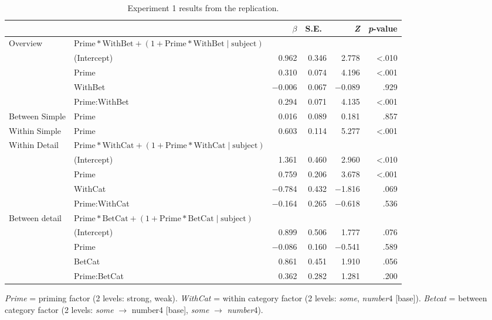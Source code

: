 \documentclass[10pt]{article}
\begin{document}
\begin{multicols}{2}
\begin{table}[ht]
  \caption{Experiment 1 results from the replication.}\vspace{-20pt}
  \label{tab:represults}
  \begin{center}
    \begin{tabular}{llrrrr}
      \hline
      & & \(\beta\) & S.E.\ & \emph{Z} & \emph{p}-value  \\
      \hline
      Overview & \(\text{Prime} * \text{WithBet} + (1 + \text{Prime} * \text{WithBet} \mid \text{subject})\) & & & \\
      & (Intercept)   & 0.962  & 0.346 &  2.778 & <.010 \\
      & Prime         & 0.310  & 0.074 &  4.196 & <.001 \\
      & WithBet       & \(-\)0.006 & 0.067 & \(-\)0.089 &  .929 \\
      & Prime:WithBet & 0.294  & 0.071 &  4.135 & <.001 \\
      Between Simple & Prime & 0.016 & 0.089 & 0.181 & .857  \\
      Within Simple  & Prime & 0.603 & 0.114 & 5.277 & <.001 \\
      Within Detail & \multicolumn{2}{l}{\(\text{Prime} * \text{WithCat} + (1 + \text{Prime} * \text{WithCat} \mid \text{subject})\)}  & & & \\
      & (Intercept)   &  1.361 & 0.460 &  2.960 & <.010 \\
      & Prime         &  0.759 & 0.206 &  3.678 & <.001 \\
      & WithCat       & \(-\)0.784 & 0.432 & \(-\)1.816 & .069  \\
      & Prime:WithCat & \(-\)0.164 & 0.265 & \(-\)0.618 & .536  \\
      Between detail & \multicolumn{2}{l}{\(\text{Prime} * \text{BetCat} + (1 + \text{Prime} * \text{BetCat} \mid \text{subject})\)}  & & & \\
      & (Intercept)  &  0.899 & 0.506 &  1.777 & .076 \\
      & Prime        & \(-\)0.086 & 0.160 & \(-\)0.541 & .589 \\
      & BetCat       & 0.861  & 0.451 &  1.910 & .056 \\
      & Prime:BetCat &  0.362 & 0.282 &  1.281 & .200 \\
      \hline
    \end{tabular}
\end{center}
  \emph{Prime} = priming factor (2 levels: strong, weak).
  \emph{WithCat} = within category factor (2 levels: \emph{some}, \emph{number}4 [base]).
  \emph{Betcat} = between category factor (2 levels: \emph{some} \(\rightarrow\) number4 [base], \emph{some} \(\rightarrow\) \emph{number}4).
\end{table}




\end{multicols}
\end{document}
